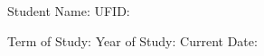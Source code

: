 \documentclass[11pt]{article}
\begin{document}
{}

\vspace{0.5cm}

Student Name: \underline{\hspace{3.3in}} UFID: \underline{\hspace{3in}}

\vspace{0.5cm}

Term of Study: \underline{\hspace{1.45in}} Year of Study: \underline{\hspace{1.45in}} Current Date: \underline{\hspace{1.8in}}

\vspace{0.1cm}







\end{document}
